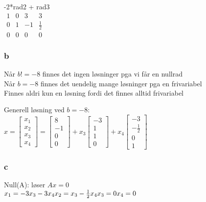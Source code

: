 \documentclass{article}
\begin{document}
-2*rad2 + rad3\\
$
\begin{matrix}
    1 & 0 & 3 & 3\\
    0 & 1 & -1 & \frac{1}{2}\\
    0 & 0 & 0 & 0
\end{matrix}
$

\subsubsection*{b}

Når $b !=-8$ finnes det ingen løsninger pga vi får en nullrad\\
Når $b = -8$ finnes det uendelig mange løsninger pga en frivariabel\\
Finnes aldri kun en løsning fordi det finnes alltid frivariabel

Generell løsning ved $b=-8$:\\
$x= [
\begin{matrix}
    x_{1}\\
    x_{2}\\
    x_{3}\\
    x_{4}
\end{matrix}
]= [
\begin{matrix}
    8\\
    -1\\
    0\\
    0
\end{matrix}
] +x_{3}[
\begin{matrix}
    -3\\
    1\\
    1\\
    0
\end{matrix}
] +x_{4}[
\begin{matrix}
    -3\\
    -\frac{1}{2}\\
    0\\
    1
\end{matrix}
]
$

\subsubsection*{c}

Null(A): løser $Ax=0$\\
$x_{1} = -3x_{3}-3x_{4}\\
x_{2} = x_{3} - \frac{1}{2}x_{4}\\
x_{3} = 0\\
x_{4} = 0
$
\end{document}
